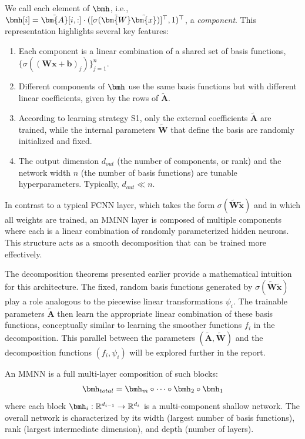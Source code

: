 \documentclass{article}
\begin{document}
We call each element of $\bmh$, i.e., $\bmh[i] = \tilde{\bm{A}}[i, :] \cdot ([\sigma(\tilde{\bm{W}}\tilde{\bm{x}})]^{\top}, 1)^{\top}$, a \textit{component}. This representation highlights several key features:
\begin{enumerate}
    \item Each component is a linear combination of a shared set of basis functions, $\{\sigma((\bm{W}\bm{x}+\bm{b})_j)\}_{j=1}^n$.
    \item Different components of $\bmh$ use the same basis functions but with different linear coefficients, given by the rows of $\tilde{\bm{A}}$.
    \item According to learning strategy S1, only the external coefficients $\tilde{\bm{A}}$ are trained, while the internal parameters $\tilde{\bm{W}}$ that define the basis are randomly initialized and fixed.
    \item The output dimension $d_{out}$ (the number of components, or rank) and the network width $n$ (the number of basis functions) are tunable hyperparameters. Typically, $d_{out} \ll n$.
\end{enumerate}

In contrast to a typical FCNN layer, which takes the form $\sigma(\tilde{\bm{W}}\tilde{\bm{x}})$ and in which all weights are trained, an MMNN layer is composed of multiple components where each is a linear combination of randomly parameterized hidden neurons. This structure acts as a smooth decomposition that can be trained more effectively.

The decomposition theorems presented earlier provide a mathematical intuition for this architecture. The fixed, random basis functions generated by $\sigma(\tilde{\bm{W}}\tilde{\bm{x}})$ play a role analogous to the piecewise linear transformations $\psi_i$. The trainable parameters $\tilde{\bm{A}}$ then learn the appropriate linear combination of these basis functions, conceptually similar to learning the smoother functions $f_i$ in the decomposition. This parallel between the parameters $(\tilde{\bm{A}}, \tilde{\bm{W}})$ and the decomposition functions $(f_i, \psi_i)$ will be explored further in the report.

An MMNN is a full multi-layer composition of such blocks:
\begin{equation}
    \bmh_{total} = \bmh_m \circ \cdots \circ \bmh_2 \circ \bmh_1
\end{equation}
where each block $\bmh_i: \mathbb{R}^{d_{i-1}} \to \mathbb{R}^{d_i}$ is a multi-component shallow network. The overall network is characterized by its width (largest number of basis functions), rank (largest intermediate dimension), and depth (number of layers).
\end{document}
